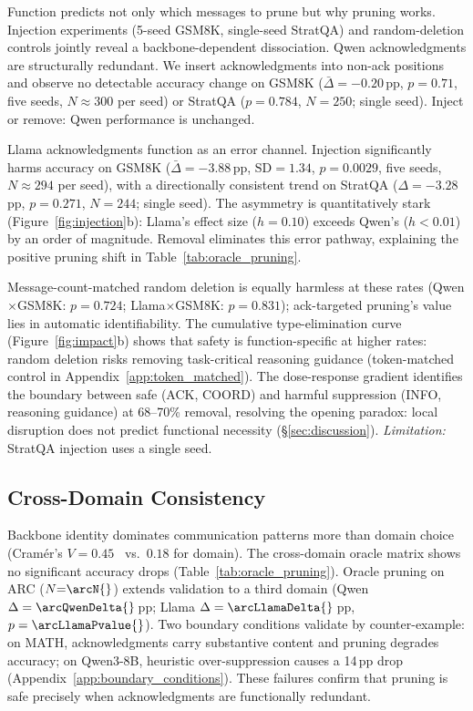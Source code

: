 Function predicts not only which messages to prune but why pruning works. Injection experiments (5-seed GSM8K, single-seed StratQA) and random-deletion controls jointly reveal a backbone-dependent dissociation.
Qwen acknowledgments are structurally redundant. We insert acknowledgments into non-ack positions and observe no detectable accuracy change on GSM8K ($\bar{\Delta} = -0.20$\,pp, $p = 0.71$, five seeds, $N \approx 300$ per seed) or StratQA ($p = 0.784$, $N = 250$; single seed). Inject or remove: Qwen performance is unchanged.

Llama acknowledgments function as an error channel. Injection significantly harms accuracy on GSM8K ($\bar{\Delta} = -3.88$\,pp, $\mathrm{SD} = 1.34$, $p = 0.0029$, five seeds, $N \approx 294$ per seed), with a directionally consistent trend on StratQA ($\Delta = -3.28$\,pp, $p = 0.271$, $N = 244$; single seed). The asymmetry is quantitatively stark (Figure~\ref{fig:injection}b): Llama's effect size ($h = 0.10$) exceeds Qwen's ($h < 0.01$) by an order of magnitude. Removal eliminates this error pathway, explaining the positive pruning shift in Table~\ref{tab:oracle_pruning}.

Message-count-matched random deletion is equally harmless at these rates (Qwen$\times$GSM8K: $p = 0.724$; Llama$\times$GSM8K: $p = 0.831$); ack-targeted pruning's value lies in automatic identifiability. The cumulative type-elimination curve (Figure~\ref{fig:impact}b) shows that safety is function-specific at higher rates: random deletion risks removing task-critical reasoning guidance (token-matched control in Appendix~\ref{app:token_matched}). The dose-response gradient identifies the boundary between safe (ACK, COORD) and harmful suppression (INFO, reasoning guidance) at 68--70\% removal, resolving the opening paradox: local disruption does not predict functional necessity (\S\ref{sec:discussion}). \emph{Limitation:} StratQA injection uses a single seed.

\subsection{Cross-Domain Consistency}
\label{sec:cross_domain}

Backbone identity dominates communication patterns more than domain choice (Cram\'{e}r's $V = 0.45$~\citep{cramer_1946} vs.\ $0.18$ for domain). The cross-domain oracle matrix shows no significant accuracy drops (Table~\ref{tab:oracle_pruning}). Oracle pruning on ARC ($N{=}\arcN{}$) extends validation to a third domain (Qwen $\Delta = \arcQwenDelta{}$\,pp; Llama $\Delta = \arcLlamaDelta{}$\,pp, $p = \arcLlamaPvalue{}$). Two boundary conditions validate by counter-example: on MATH, acknowledgments carry substantive content and pruning degrades accuracy; on Qwen3-8B, heuristic over-suppression causes a 14\,pp drop (Appendix~\ref{app:boundary_conditions}). These failures confirm that pruning is safe precisely when acknowledgments are functionally redundant.

